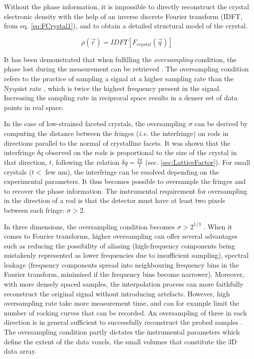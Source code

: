 Without the phase information, it is impossible to directly reconstruct the crystal electronic density with the help of an inverse discrete Fourier transform (IDFT, from eq. \ref{eq:FCrystal1}), and to obtain a detailed structural model of the crystal.

\begin{equation}
    \label{eq:IDFT}
    \rho(\vec{r}) = IDFT [F_{crystal}(\vec{q})] %
\end{equation}

It has been demonstrated that when fulfilling the \textit{oversampling} condition, the phase lost during the measurement can be retrieved \parencite{Shannon1949, Sayre1952}.
The oversampling condition refers to the practice of sampling a signal at a higher sampling rate than the Nyquist rate \parencite{Miao2000}, which is twice the highest frequency present in the signal.
Increasing the sampling rate in reciprocal space results in a denser set of data points in real space.

In the case of low-strained faceted crystals, the oversampling $\sigma$ can be derived by computing the distance between the fringes (\textit{i.e.} the interfringe) on rods in directions parallel to the normal of crystalline facets.
It was shown that the interfringe $\delta q$ observed on the rods is proportional to the size of the crystal in that direction, $t$, following the relation $\delta q = \frac{2\pi}{t}$ (sec. \ref{sec:LatticeFactor}).
For small crystals ($t<$ few \unit{um}), the interfringe can be resolved depending on the experimental parameters.
It thus becomes possible to oversample the fringes and to recover the phase information.
The instrumental requirement for oversampling in the direction of a rod is that the detector must have at least two pixels between each fringe: $\sigma >2$.

In three dimensions, the oversampling condition becomes $\sigma>2^{1/3}$ \parencite{Miao1998, Miao2000, Miao2000a}.
When it comes to Fourier transforms, higher oversampling can offer several advantages such as reducing the possibility of aliasing (high-frequency components being mistakenly represented as lower frequencies due to insufficient sampling), spectral leakage (frequency components spread into neighbouring frequency bins in the Fourier transform, minimised if the frequency bins become narrower).
Moreover, with more densely spaced samples, the interpolation process can more faithfully reconstruct the original signal without introducing artefacts.
However, high oversampling rate take more measurement time, and can for example limit the number of rocking curves that can be recorded.
An oversampling of three in each direction is in general sufficient to successfully reconstruct the probed samples \parencite{Dupraz2015}.
The oversampling condition partly dictates the instrumental parameters which define the extent of the data voxels, the small volumes that constitute the 3D data array.

